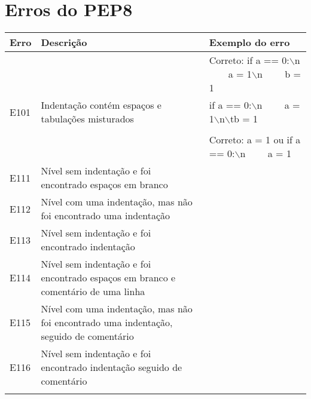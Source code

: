 \chapter{Erros do PEP8}
\label{apendice:pep8}

	\begin{table}
		\scriptsize
		\begin{tabularx}{\linewidth}{ |l|X|X| }
			\hline
			\textbf{Erro}
			& \textbf{Descrição}
			& \textbf{Exemplo do erro} \\
			\hline
			
			&
			& Correto: if a == 0:$\backslash$n \ \ \ \ a = 1$\backslash$n \ \ \ \ b = 1 \\
			\hline
			E101
			& Indentação contém espaços e tabulações misturados
			& if a == 0:$\backslash$n \ \ \ \ a = 1$\backslash$n$\backslash$tb = 1 \\
			\hline
			
			&
			&  \\
			\hline
			
			&
			& Correto: a = 1 ou if a == 0:$\backslash$n \ \ \ \ a = 1 \\
			\hline
			E111
			& Nível sem indentação e foi encontrado espaços em branco
			&  \\
			\hline
			E112
			& Nível com uma indentação, mas não foi encontrado uma indentação
			&  \\
			\hline
			E113
			& Nível sem indentação e foi encontrado indentação
			&  \\
			\hline
			E114
			& Nível sem indentação e foi encontrado espaços em branco e comentário de uma linha
			&  \\
			\hline
			E115
			& Nível com uma indentação, mas não foi encontrado uma indentação, seguido de comentário
			&  \\
			\hline
			E116
			& Nível sem indentação e foi encontrado indentação seguido de comentário
			&  \\
			\hline
			
			&  
			&  \\
			\hline
			

\end{tabularx}
\end{table}
